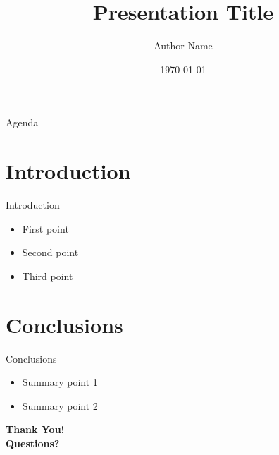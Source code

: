 \documentclass[aspectratio=169,12pt]{beamer}
\title{Presentation Title}
\author{Author Name}
\institute{Institution}
\date{\today}
\begin{document}
\begin{frame}
  \titlepage
\end{frame}

\begin{frame}{Agenda}
  \tableofcontents
\end{frame}

\section{Introduction}

\begin{frame}{Introduction}
  \begin{itemize}
    \item First point
    \item Second point
    \item Third point
  \end{itemize}
\end{frame}

\section{Conclusions}

\begin{frame}{Conclusions}
  \begin{itemize}
    \item Summary point 1
    \item Summary point 2
  \end{itemize}
\end{frame}

\begin{frame}
  \centering
  \Huge\bfseries\color{mlblue} Thank You!\\[1em]
  \normalsize Questions?
\end{frame}
\end{document}
